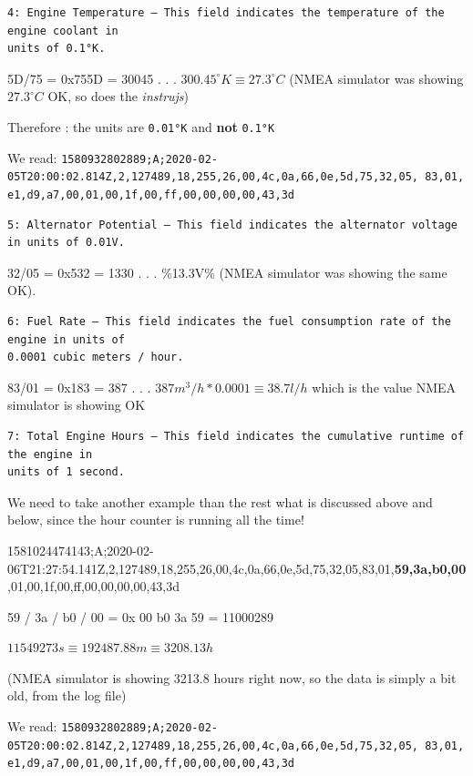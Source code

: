 \documentclass[11pt]{article}
\begin{document}
\begin{verbatim}
4: Engine Temperature – This field indicates the temperature of the engine coolant in
units of 0.1°K.
\end{verbatim}

5D/75 = 0x755D = 30045 . . . \(300.45^{\circ}K \equiv 27.3^{\circ}C\)
(NMEA simulator was showing \(27.3^{\circ}C\) OK, so does the
\emph{instrujs})

Therefore : the units are \texttt{0.01°K} and \textbf{not}
\texttt{0.1°K}

    We read:
\texttt{1580932802889;A;2020-02-05T20:00:02.814Z,2,127489,18,255,26,00,4c,0a,66,0e,5d,75,32,05,\ 83,01,e1,d9,a7,00,01,00,1f,00,ff,00,00,00,00,43,3d}

\begin{verbatim}
5: Alternator Potential – This field indicates the alternator voltage in units of 0.01V. 
\end{verbatim}

32/05 = 0x532 = 1330 . . . \%13.3V\% (NMEA simulator was showing the
same OK).

    \begin{verbatim}
6: Fuel Rate – This field indicates the fuel consumption rate of the engine in units of
0.0001 cubic meters / hour.
\end{verbatim}

83/01 = 0x183 = 387 . . . \(387m^{3}/h * 0.0001 \equiv 38.7l/h\) which
is the value NMEA simulator is showing OK

    \begin{verbatim}
7: Total Engine Hours – This field indicates the cumulative runtime of the engine in
units of 1 second.
\end{verbatim}

We need to take another example than the rest what is discussed above
and below, since the hour counter is running all the time!

1581024474143;A;2020-02-06T21:27:54.141Z,2,127489,18,255,26,00,4c,0a,66,0e,5d,75,32,05,83,01,\textbf{59,3a,b0,00},01,00,1f,00,ff,00,00,00,00,43,3d

59 / 3a / b0 / 00 = 0x 00 b0 3a 59 = 11000289

\(11549273s \equiv 192487.88m \equiv 3208.13h\)

(NMEA simulator is showing 3213.8 hours right now, so the data is simply
a bit old, from the log file)

    We read:
\texttt{1580932802889;A;2020-02-05T20:00:02.814Z,2,127489,18,255,26,00,4c,0a,66,0e,5d,75,32,05,\ 83,01,e1,d9,a7,00,01,00,1f,00,ff,00,00,00,00,43,3d}
\end{document}
